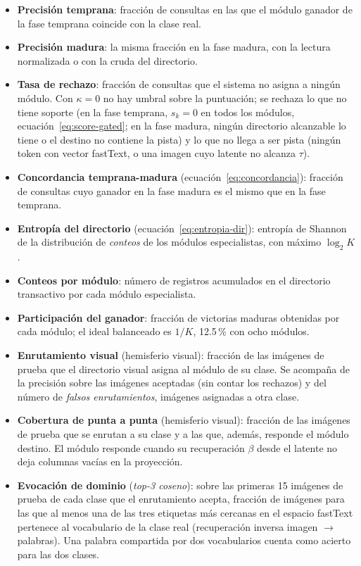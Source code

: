 \begin{itemize}
    \item \textbf{Precisión temprana}: fracción de consultas en las que el módulo ganador de la fase temprana coincide con la clase real.
    \item \textbf{Precisión madura}: la misma fracción en la fase madura, con la lectura normalizada o con la cruda del directorio.
    \item \textbf{Tasa de rechazo}: fracción de consultas que el sistema no asigna a
    ningún módulo. Con $\kappa = 0$ no hay umbral sobre la puntuación; se rechaza lo que
    no tiene soporte (en la fase temprana, $s_k = 0$ en todos los módulos,
    ecuación~\eqref{eq:score-gated}; en la fase madura, ningún directorio alcanzable lo
    tiene o el destino no contiene la pista) y lo que no llega a ser pista (ningún token
    con vector fastText, o una imagen cuyo latente no alcanza $\tau$).
    \item \textbf{Concordancia temprana-madura} (ecuación~\eqref{eq:concordancia}): fracción de consultas cuyo ganador en la fase madura es el mismo que en la fase temprana.
    \item \textbf{Entropía del directorio} (ecuación~\eqref{eq:entropia-dir}): entropía de Shannon de la distribución de \textit{conteos} de los módulos especialistas, con máximo $\log_2 K$.
    \item \textbf{Conteos por módulo}: número de registros acumulados en el directorio transactivo por cada módulo especialista.
    \item \textbf{Participación del ganador}: fracción de victorias maduras obtenidas por cada módulo; el ideal balanceado es $1/K$, 12.5\,\% con ocho módulos.
    \item \textbf{Enrutamiento visual} (hemisferio visual): fracción de las imágenes de
    prueba que el directorio visual asigna al módulo de su clase. Se acompaña de la
    precisión sobre las imágenes aceptadas (sin contar los rechazos) y del número de
    \emph{falsos enrutamientos}, imágenes asignadas a otra clase.
    \item \textbf{Cobertura de punta a punta} (hemisferio visual): fracción de las
    imágenes de prueba que se enrutan a su clase y a las que, además, responde el módulo
    destino. El módulo responde cuando su recuperación $\beta$ desde el latente no deja
    columnas vacías en la proyección.
    \item \textbf{Evocación de dominio} (\textit{top-3 coseno}): sobre las primeras 15 imágenes de prueba de cada clase que el enrutamiento acepta, fracción de imágenes para las que al menos una de las tres etiquetas más cercanas en el espacio fastText pertenece al vocabulario de la clase real (recuperación inversa imagen $\to$ palabras). Una palabra compartida por dos vocabularios cuenta como acierto para las dos clases.
\end{itemize}

